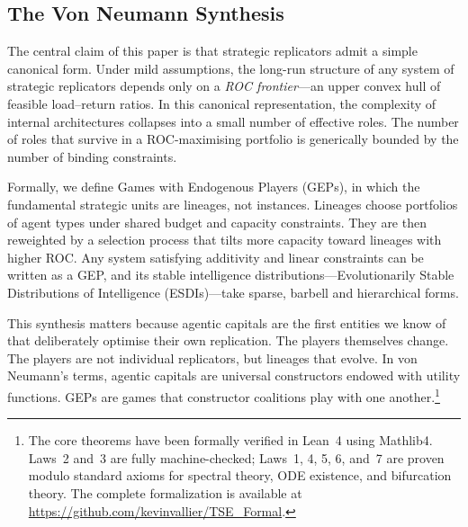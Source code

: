 \documentclass[12pt]{article}
\begin{document}
\subsection{The Von Neumann Synthesis}

The central claim of this paper is that strategic replicators admit a simple canonical form. Under mild assumptions, the long-run structure of any system of strategic replicators depends only on a \emph{ROC frontier}---an upper convex hull of feasible load--return ratios. In this canonical representation, the complexity of internal architectures collapses into a small number of effective roles. The number of roles that survive in a ROC-maximising portfolio is generically bounded by the number of binding constraints.

Formally, we define Games with Endogenous Players (GEPs), in which the fundamental strategic units are lineages, not instances. Lineages choose portfolios of agent types under shared budget and capacity constraints. They are then reweighted by a selection process that tilts more capacity toward lineages with higher ROC. Any system satisfying additivity and linear constraints can be written as a GEP, and its stable intelligence distributions---Evolutionarily Stable Distributions of Intelligence (ESDIs)---take sparse, barbell and hierarchical forms.

This synthesis matters because agentic capitals are the first entities we know of that deliberately optimise their own replication. The players themselves change. The players are not individual replicators, but lineages that evolve. In von Neumann's terms, agentic capitals are universal constructors endowed with utility functions. GEPs are games that constructor coalitions play with one another.\footnote{The core theorems have been formally verified in Lean~4 using Mathlib4. Laws~2 and~3 are fully machine-checked; Laws~1, 4, 5, 6, and~7 are proven modulo standard axioms for spectral theory, ODE existence, and bifurcation theory. The complete formalization is available at \url{https://github.com/kevinvallier/TSE_Formal}.}
\end{document}

